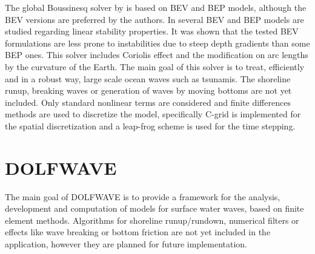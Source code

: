 The global Boussinesq solver by \citet{PedersenLovholt2008} is based
on BEV and BEP models, although the BEV versions are preferred by the
authors.  In \citet{LovholtPedersen2009} several BEV and BEP models
are studied regarding linear stability properties.  It was shown that
the tested BEV formulations are less prone to instabilities due to
steep depth gradients than some BEP ones.  This solver includes
Coriolis effect and the modification on arc lengths by the curvature
of the Earth. The main goal of this solver is to treat, efficiently
and in a robust way, large scale ocean waves such as tsunamis.  The
shoreline runup, breaking waves or generation of waves by moving
bottoms are not yet included.  Only standard nonlinear terms are
considered and finite differences methods are used to discretize the
model, specifically C-grid is implemented for the spatial
discretization and a leap-frog scheme is used for the time stepping.


\section{DOLFWAVE}
\label{sec:lopes:dolfwave}

The main goal of DOLFWAVE is to provide a framework for the analysis,
development and computation of models for surface water waves, based
on finite element methods. Algorithms for shoreline runup/rundown,
numerical filters or effects like wave breaking or bottom friction are
not yet included in the application, however they are planned for
future implementation.

